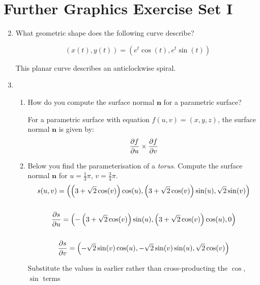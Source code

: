 \documentclass[10pt,\jkfside,a4paper]{article}
\begin{document}
\section*{Further Graphics Exercise Set I}

\begin{enumerate}

\setcounter{enumi}{1}

\item What geometric shape does the following curve describe?

\[
\left( x(t), y(t) \right) = \left( e^t\cos(t), e^t \sin(t) \right)
\]

This planar curve describes an anticlockwise spiral.

\item

\begin{enumerate}

\item How do you compute the surface normal $\mathbf{n}$ for a parametric
surface?

For a parametric surface with equation $f(u, v) = (x, y, z)$, the
surface normal $\mathbf{n}$ is given by:
\[
\pdv{f}{u}\times\pdv{f}{v}
\]

\item Below you find the parameterisation of a \textit{torus}. Compute the
surface normal $\mathbf{n}$ for $u = \frac{1}{3}\pi$, $v = \frac{3}{4}\pi$.
\begin{gather*}
s(u, v) = \left(\left(3 + \sqrt{2} \cos(v)\right)\cos(u), \left(3 + \sqrt{2} \cos(v)\right)\sin(u), \sqrt{2} \sin(v) \right) \\\\
\pdv{s}{u} =
\left(-\left(3 + \sqrt{2} \cos(v)\right)\sin(u), \left(3 + \sqrt{2} \cos(v)\right)\cos(u), 0 \right) \\\\
\pdv{s}{v} =
\left(-\sqrt{2} \sin(v)\cos(u), -\sqrt{2} \sin(v)\sin(u), \sqrt{2} \cos(v)\right)
\end{gather*}

{\color{blue} Substitute the values in earlier rather than cross-producting
the $\cos$, $\sin$ terms}


\end{enumerate}
\end{enumerate}
\end{document}
